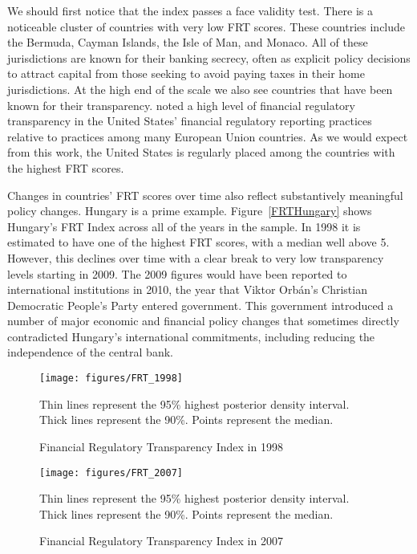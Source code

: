 \documentclass[a4paper]{article}
\begin{document}
We should first notice that the index passes a face validity test. There is a noticeable cluster of countries with very low FRT scores. These countries include the Bermuda, Cayman Islands, the Isle of Man, and Monaco. All of these jurisdictions are known for their banking secrecy, often as explicit policy decisions to attract capital from those seeking to avoid paying taxes in their home jurisdictions. At the high end of the scale we also see countries that have been known for their transparency. \cite{Gandrud2014a} noted a high level of financial regulatory transparency in the United States' financial regulatory reporting practices relative to practices among many European Union countries. As we would expect from this work, the United States is regularly placed among the countries with the highest FRT scores.

Changes in countries' FRT scores over time also reflect substantively meaningful policy changes. Hungary is a prime example. Figure~\ref{FRTHungary} shows Hungary's FRT Index across all of the years in the sample. In 1998 it is estimated to have one of the highest FRT scores, with a median well above 5. However, this declines over time with a clear break to very low transparency levels starting in 2009. The 2009 figures would have been reported to international institutions in 2010, the year that Viktor Orb\'{a}n's Christian Democratic People's Party entered government. This government introduced a number of major economic and financial policy changes that sometimes directly contradicted Hungary's international commitments, including reducing the independence of the central bank.

\begin{figure}
    \caption{Financial Regulatory Transparency Index in 1998}
    \label{FRT_1998}
    \begin{center}
        \texttt{[image: figures/FRT\_1998]}
    \end{center}
    {\scriptsize{Thin lines represent the 95\% highest posterior density interval. Thick lines represent the 90\%. Points represent the median.}}
\end{figure}

\begin{figure}
    \caption{Financial Regulatory Transparency Index in 2007}
    \label{FRT_2007}
    \begin{center}
        \texttt{[image: figures/FRT\_2007]}
    \end{center}
    {\scriptsize{Thin lines represent the 95\% highest posterior density interval. Thick lines represent the 90\%. Points represent the median.}}
\end{figure}
\end{document}
